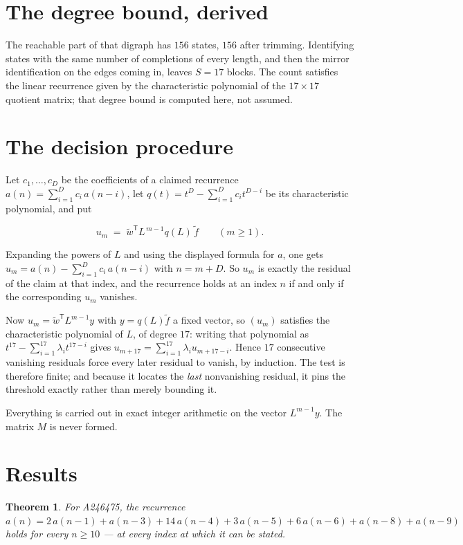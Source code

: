 \documentclass[11pt]{article}
\newtheorem{theorem}{Theorem}
\theoremstyle{definition}
\begin{document}
\section{The degree bound, derived}

The reachable part of that digraph has $156$ states, $156$ after trimming. Identifying states with the same number of completions of every length, and then the mirror identification on the edges coming in, leaves $S = 17$ blocks. The count satisfies the linear recurrence given by the characteristic polynomial of the $17\times17$ quotient matrix; that degree bound is computed here, not assumed.

\section{The decision procedure}

Let $c_1,\dots,c_D$ be the coefficients of a claimed recurrence $a(n) = \sum_{i=1}^{D} c_i\,a(n-i)$, let $q(t) = t^{D} - \sum_{i=1}^{D} c_i t^{D-i}$ be its characteristic polynomial, and put

\[u_m \;=\; \tilde w^{\mathsf T} L^{\,m-1} q(L)\,\tilde f \qquad (m \ge 1).\]

Expanding the powers of $L$ and using the displayed formula for $a$, one gets $u_m = a(n) - \sum_{i=1}^{D} c_i\,a(n-i)$ with $n = m + D$. So $u_m$ is exactly the residual of the claim at that index, and the recurrence holds at an index $n$ if and only if the corresponding $u_m$ vanishes.

Now $u_m = \tilde w^{\mathsf T} L^{m-1} y$ with $y = q(L)\tilde f$ a fixed vector, so $(u_m)$ satisfies the characteristic polynomial of $L$, of degree $17$: writing that polynomial as $t^{17} - \sum_{i=1}^{17} \lambda_i t^{17-i}$ gives $u_{m+17} = \sum_{i=1}^{17} \lambda_i u_{m+17-i}$. Hence $17$ consecutive vanishing residuals force every later residual to vanish, by induction. The test is therefore finite; and because it locates the {\itshape last} nonvanishing residual, it pins the threshold exactly rather than merely bounding it.

Everything is carried out in exact integer arithmetic on the vector $L^{m-1}y$. The matrix $M$ is never formed.

\section{Results}

\begin{theorem} For A246475, the recurrence $a(n) = 2\,a(n-1) + a(n-3) + 14\,a(n-4) + 3\,a(n-5) + 6\,a(n-6) + a(n-8) + a(n-9)$ holds for every $n \ge 10$ --- at every index at which it can be stated.\end{theorem}
\end{document}
